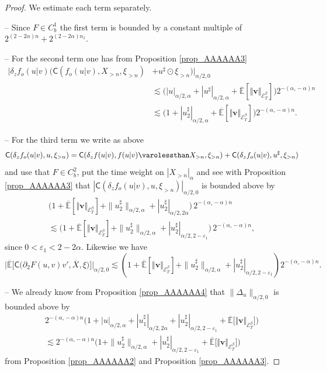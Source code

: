 \documentclass[10pt]{amsart}
\theoremstyle{definition}
\let\epsilon\varepsilon
\newcommand\bbE{\mathbb{E}}
\newcommand{\mcE}{\mathcal{E}}
\newcommand{\bsv}{\boldsymbol{v}}
\newcommand{\norme}[1]{\Vert #1 \Vert}
\begin{document}
\begin{proof} We estimate each term separately.

-- Since $F \in C^1_b$ the first term is bounded by a constant multiple of $2^{(2 - 2 \alpha) n} + 2^{(2 - 2 \alpha) n_1}$.

-- For the second term one has from Proposition \ref{prop_AAAAAA3}
\begin{align*}
| \delta_z f_o (u\vert v) (\mathsf{C} (f_o (u\vert v), X_{> n}, \xi_{> n}) &+ u^{\sharp} \odot \xi_{>
n}) |_{\alpha / 2, 0} \\
&\lesssim \bigl(| u |_{\alpha / 2, \alpha} + |
u^{\sharp} |_{\alpha / 2, \alpha} + \overline{\bbE}[\norme{\bsv}_{\mcE^\beta_T}] \bigr) 2^{- (\alpha_{\circ} - \alpha) n}
\\
& \lesssim \bigl(1 + | u_2^{\sharp} |_{\alpha / 2, \alpha} + \overline{\bbE}[\norme{\bsv}_{\mcE^\beta_T}] \bigr) 2^{-
(\alpha_{\circ} - \alpha) n}.
\end{align*}

-- For the third term we write as above
\[
\mathsf{C} (\delta_z f_o(u\vert v), u, \xi_{> n}) = \mathsf{C} ( \delta_z f (u\vert v), f (u\vert v) \varolessthan X_{> n}, \xi_{> n}) + \mathsf{C} (\delta_z f_o (u\vert v), u^{\sharp}, \xi_{> n})
\]
and use that $F \in C^2_b$, put the time weight on $| X_{> n} |_{\alpha}$ and see with Proposition \ref{prop_AAAAAA3} that $| \mathsf{C} (\delta_zf_o(u\vert v), u, \xi_{> n}) |_{\alpha /
2, 0}$ is bounded above by
\begin{multline*}
\bigl(1 +\overline{\bbE}[\norme{\bsv}_{\mcE^\beta_T}] + \| u^{\sharp}_2 \|_{\alpha / 2, \alpha} + | u_2^{\sharp} |_{\alpha / 2, 2 \alpha}\bigr) \, 2^{- (\alpha_{\circ} - \alpha) n} \\
\lesssim \bigl(1 +\overline{\bbE}[\norme{\bsv}_{\mcE^\beta_T}]+ \| u^{\sharp}_2 \|_{\alpha / 2, \alpha} + | u_2^{\sharp} |_{\alpha / 2, 2 - \epsilon_1}\bigr) \, 2^{- (\alpha_{\circ} - \alpha) n},
\end{multline*}
since $0 < \epsilon_1 < 2 - 2 \alpha$. Likewise we have
\[
\big|\overline{\bbE}\bigl[\mathsf{C}\bigl(\partial_2 F(u,v)v', \overline{X},\xi\bigr)\bigr] \big|_{\alpha/2,0} \lesssim (1 +\overline{\bbE}[\norme{\bsv}_{\mcE^\beta_T}] + \| u^{\sharp}_2 \|_{\alpha / 2, \alpha} + | u_2^{\sharp} |_{\alpha / 2, 2 - \epsilon_1}) 2^{- (\alpha_{\circ} - \alpha) n}.
\]

-- We already know from Proposition \ref{prop_AAAAAA4} that $\| \Delta_u \|_{\alpha / 2, 0}$ is bounded above by
\begin{multline*}
2^{- (\alpha_{\circ} - \alpha) n} \bigl( 1 + | u |_{\alpha / 2, \alpha} +
| {u_1^{\sharp}} |_{\alpha / 2, 2 \alpha} + |
{u_2^{\sharp}} |_{\alpha / 2, 2 - \epsilon_1} +\overline{\bbE}\bigl[\norme{\bsv}_{\mcE^\beta_T}\bigr] \bigr)
\\
\lesssim
2^{-(\alpha_{\circ} - \alpha) n} \bigl(1 + \| u^{\sharp}_2 \|_{\alpha / 2, \alpha} +
| u_2^{\sharp} |_{\alpha / 2, 2 - \epsilon_1} +\overline{\bbE}\bigl[\norme{\bsv}_{\mcE^\beta_T}\bigr]\bigr)
\end{multline*}
from Proposition \ref{prop_AAAAAA2} and Proposition \ref{prop_AAAAAA3}.


\end{proof}
\end{document}
